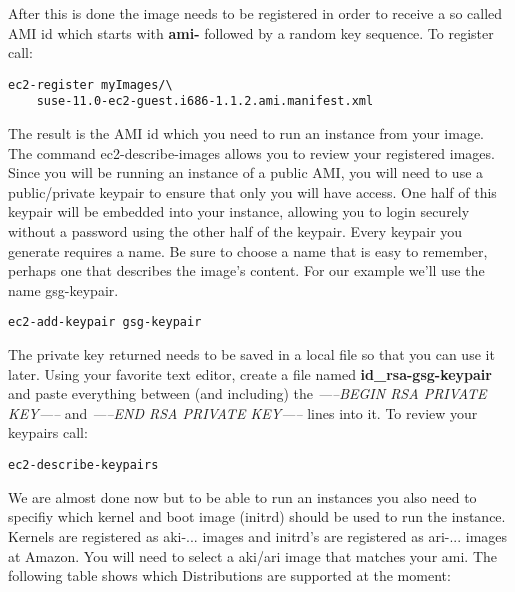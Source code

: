 After this is done the image needs to be registered in order to
receive a so called AMI id which starts with \textbf{ami-} followed
by a random key sequence. To register call:

\begin{Command}{13cm}
\begin{verbatim}
ec2-register myImages/\
    suse-11.0-ec2-guest.i686-1.1.2.ami.manifest.xml
\end{verbatim}
\end{Command}

The result is the AMI id which you need to run an instance from
your image. The command ec2-describe-images allows you to review your
registered images. Since you will be running an instance of a public AMI,
you will need to use a public/private keypair to ensure that only you
will have access. One half of this keypair will be embedded into your
instance, allowing you to login securely without a password using the
other half of the keypair. Every keypair you generate requires a name.
Be sure to choose a name that is easy to remember, perhaps one that
describes the image's content. For our example we'll use the name
gsg-keypair.

\begin{Command}{10cm}
\begin{verbatim}
ec2-add-keypair gsg-keypair
\end{verbatim}
\end{Command}

The private key returned needs to be saved in a local file so that
you can use it later. Using your favorite text editor, create a file
named \textbf{id\_rsa-gsg-keypair} and paste everything between
(and including) the \textit{-----BEGIN RSA PRIVATE KEY-----} and
\textit{-----END RSA PRIVATE KEY-----} lines into it. To review
your keypairs call:

\begin{Command}{10cm}
\begin{verbatim}
ec2-describe-keypairs
\end{verbatim}
\end{Command}

We are almost done now but to be able to run an instances you also need
to specifiy which kernel and boot image (initrd) should be used to run
the instance. Kernels are registered as aki-... images and initrd's
are registered as ari-... images at Amazon. You will need to select a
aki/ari image that matches your ami. The following table shows which
Distributions are supported at the moment:\\

